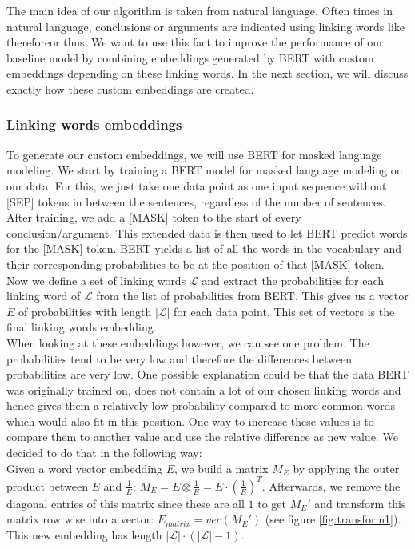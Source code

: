The main idea of our algorithm is taken from natural language. Often times in natural language, conclusions or arguments are indicated using linking words like \dq therefore\dq or \dq thus\dq. We want to use this fact to improve the performance of our baseline model by combining embeddings generated by BERT with custom embeddings depending on these linking words. In the next section, we will discuss exactly how these custom embeddings are created.

\subsubsection{Linking words embeddings}
To generate our custom embeddings, we will use BERT for masked language modeling. We start by training a BERT model for masked language modeling \cite{bertmask} on our data. For this, we just take one data point as one input sequence without [SEP] tokens in between the sentences, regardless of the number of sentences. After training, we add a [MASK] token to the start of every conclusion/argument. This extended data is then used to let BERT predict words for the [MASK] token. BERT yields a list of all the words in the vocabulary and their corresponding probabilities to be at the position of that [MASK] token. Now we define a set of linking words $\mathcal{L}$ and extract the probabilities for each linking word of $\mathcal{L}$ from the list of probabilities from BERT. This gives us a vector $E$ of probabilities with length $|\mathcal{L}|$ for each data point. This set of vectors is the final linking words embedding. \\

When looking at these embeddings however, we can see one problem. The probabilities tend to be very low and therefore the differences between probabilities are very low. One possible explanation could be that the data BERT was originally trained on, does not contain a lot of our chosen linking words and hence gives them a relatively low probability compared to more common words which would also fit in this position. One way to increase these values is to compare them to another value and use the relative difference as new value. We decided to do that in the following way: \\
Given a word vector embedding $E$, we build a matrix $M_E$ by applying the outer product between $E$ and $\frac{1}{E}$: $M_E = E \otimes \frac{1}{E} = E \cdot (\frac{1}{E})^T$.
Afterwards, we remove the diagonal entries of this matrix since these are all $1$ to get $M_E'$ and transform this matrix row wise into a vector: $E_{matrix} = vec(M_E')$ (see figure \ref{fig:transform1}). This new embedding has length $|\mathcal{L}| \cdot (|\mathcal{L}|-1)$.

